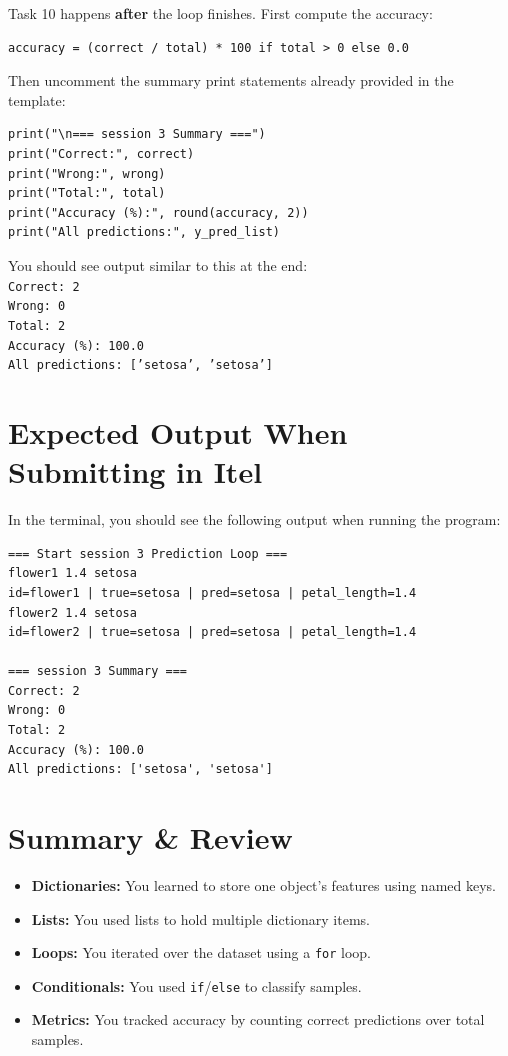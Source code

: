 Task 10 happens \textbf{after} the loop finishes. First compute the accuracy:
\begin{verbatim}
accuracy = (correct / total) * 100 if total > 0 else 0.0
\end{verbatim}

Then uncomment the summary print statements already provided in the template:
\begin{verbatim}
print("\n=== session 3 Summary ===")
print("Correct:", correct)
print("Wrong:", wrong)
print("Total:", total)
print("Accuracy (%):", round(accuracy, 2))
print("All predictions:", y_pred_list)
\end{verbatim}

\begin{tcolorbox}[title=Checkpoint and this is what is expected in ITEL]
You should see output similar to this at the end: \\
\texttt{Correct: 2} \\
\texttt{Wrong: 0} \\
\texttt{Total: 2} \\
\texttt{Accuracy (\%): 100.0} \\
\texttt{All predictions: ['setosa', 'setosa']}
\end{tcolorbox}

\section{Expected Output When Submitting in Itel}

In the terminal, you should see the following output when running the program:
\begin{verbatim}
=== Start session 3 Prediction Loop ===
flower1 1.4 setosa
id=flower1 | true=setosa | pred=setosa | petal_length=1.4
flower2 1.4 setosa
id=flower2 | true=setosa | pred=setosa | petal_length=1.4

=== session 3 Summary ===
Correct: 2
Wrong: 0
Total: 2
Accuracy (%): 100.0
All predictions: ['setosa', 'setosa']
\end{verbatim}

\section{Summary \& Review}
\begin{itemize}
    \item \textbf{Dictionaries:} You learned to store one object's features using named keys.
    \item \textbf{Lists:} You used lists to hold multiple dictionary items.
    \item \textbf{Loops:} You iterated over the dataset using a \texttt{for} loop.
    \item \textbf{Conditionals:} You used \texttt{if}/\texttt{else} to classify samples.
    \item \textbf{Metrics:} You tracked accuracy by counting correct predictions over total samples.
\end{itemize}


